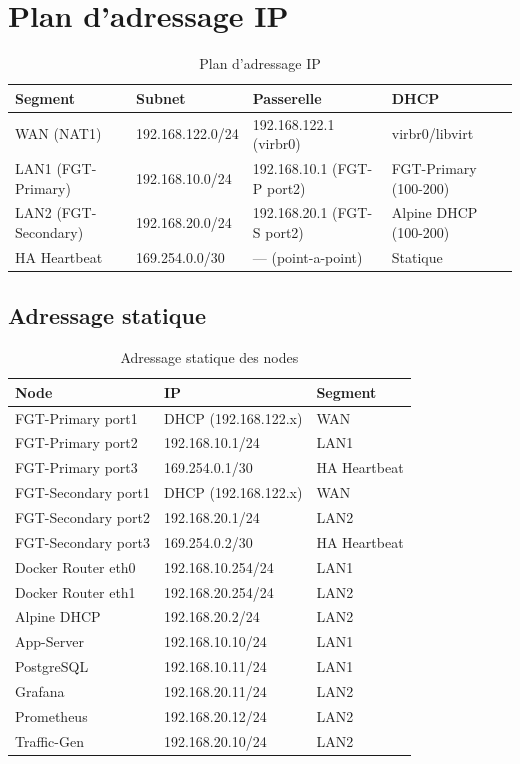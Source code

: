 \section{Plan d'adressage IP}

\begin{table}[H]
\centering
\caption{Plan d'adressage IP}
\label{tab:adressage-ip}
{\small
\begin{tabularx}{\textwidth}{|l|l|l|X|}
\hline
\textbf{Segment} & \textbf{Subnet} & \textbf{Passerelle} & \textbf{DHCP} \\
\hline
WAN (NAT1) & 192.168.122.0/24 & 192.168.122.1 (virbr0) & virbr0/libvirt \\
\hline
LAN1 (FGT-Primary) & 192.168.10.0/24 & 192.168.10.1 (FGT-P port2) & FGT-Primary (100-200) \\
\hline
LAN2 (FGT-Secondary) & 192.168.20.0/24 & 192.168.20.1 (FGT-S port2) & Alpine DHCP (100-200) \\
\hline
HA Heartbeat & 169.254.0.0/30 & --- (point-a-point) & Statique \\
\hline
\end{tabularx}
}
\end{table}

\subsection{Adressage statique}

\begin{table}[H]
\centering
\caption{Adressage statique des nodes}
\label{tab:static-ip}
\begin{tabularx}{\textwidth}{|l|l|X|}
\hline
\textbf{Node} & \textbf{IP} & \textbf{Segment} \\
\hline
FGT-Primary port1 & DHCP (192.168.122.x) & WAN \\
FGT-Primary port2 & 192.168.10.1/24 & LAN1 \\
FGT-Primary port3 & 169.254.0.1/30 & HA Heartbeat \\
\hline
FGT-Secondary port1 & DHCP (192.168.122.x) & WAN \\
FGT-Secondary port2 & 192.168.20.1/24 & LAN2 \\
FGT-Secondary port3 & 169.254.0.2/30 & HA Heartbeat \\
\hline
Docker Router eth0 & 192.168.10.254/24 & LAN1 \\
Docker Router eth1 & 192.168.20.254/24 & LAN2 \\
\hline
Alpine DHCP & 192.168.20.2/24 & LAN2 \\
App-Server & 192.168.10.10/24 & LAN1 \\
PostgreSQL & 192.168.10.11/24 & LAN1 \\
Grafana & 192.168.20.11/24 & LAN2 \\
Prometheus & 192.168.20.12/24 & LAN2 \\
Traffic-Gen & 192.168.20.10/24 & LAN2 \\
\hline
\end{tabularx}
\end{table}

